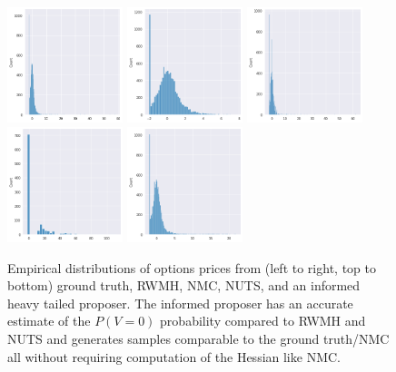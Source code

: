 \documentclass{article}
\theoremstyle{definition}
\begin{document}
{\begin{figure}[H]
    \centering
    \includegraphics[width=0.3\textwidth]{figures/option-1.png}
    \includegraphics[width=0.3\textwidth]{figures/option-2.png}
    \includegraphics[width=0.3\textwidth]{figures/option-3.png}
    \includegraphics[width=0.3\textwidth]{figures/option-4.png}
    \includegraphics[width=0.3\textwidth]{figures/option-5.png}
    \caption{Empirical distributions of options prices from 
    (left to right, top to bottom) ground truth, RWMH, NMC, NUTS, and
    an informed heavy tailed proposer. The informed proposer has an accurate estimate of the
    $P(V=0)$ probability compared to RWMH and NUTS and generates samples comparable to the ground truth/NMC
    all without requiring computation of the Hessian like NMC.}
    \label{fig:option}
\end{figure}

}
\end{document}
